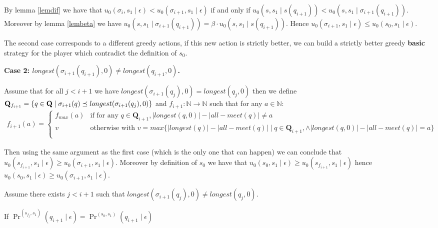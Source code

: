 \documentclass[11pt]{article}
\begin{document}
By lemma \ref{lemdif} we have that $u_0(\sigma_i,s_1 \mid \epsilon) < u_0(\sigma_{i+1},s_1 \mid \epsilon)$ if and only if $u_0(s,s_1 \mid s(q_{i+1})) < u_0(s,s_1 \mid \sigma_{i+1}(q_{i+1}))$.
Moreover by lemma \ref{lembeta} we have $u_0(s,s_1 \mid \sigma_{i+1}(q_{i+1})) = \beta \cdot u_0(s,s_1 \mid s(q_{i+1}))$.
Hence $u_0(\sigma_{i+1},s_1 \mid \epsilon) \leq u_0(s_0,s_1 \mid \epsilon)$.

\bigskip
The second case corresponds to a different greedy actions, if this new action is strictly better, we can build a strictly better greedy \textbf{basic} strategy for the player which contradict the definition of $s_0$.

\textbf{Case 2: $longest(\sigma_{i+1}(q_{i+1}),0) \neq longest(q_{i+1},0)$.}

Assume that for all $j < i+1$ we have $longest(\sigma_{i+1}(q_{j}),0) = longest(q_{j},0)$ then we define $\mathbf{Q}_{f_{i+1}} = \{q \in \mathbf{Q} \mid \sigma_{i+1}(q) \preceq longest(\sigma_{i+1}(q_{j}),0) \}$ and  $f_{i+1} : \mathbb{N} \rightarrow \mathbb{N}$ such that for any $a \in \mathbb{N}$:
\begin{eqnarray*}
f_{i+1}(a) =
\begin{cases}
f_{max}(a) & \text{if for any } q \in \mathbf{Q}_{i+1}, |longest(q,0)| - |all-meet(q)| \neq a\\
v & \text{otherwise with } v = max \{|longest(q)| - |all-meet(q)| \mid q \in \mathbf{Q}_{i+1}, \land |longest(q,0)| - |all-meet(q)| = a \}\\
\end{cases}
\end{eqnarray*}

Then using the same argument as the first case (which is the only one that can happen) we can conclude that  $u_0(s_{f_{i+1}},s_1 \mid \epsilon) \geq u_0(\sigma_{i+1},s_1 \mid \epsilon)$. Moreover by definition of $s_0$ we have that
$u_0(s_0,s_1 \mid \epsilon) \geq u_0(s_{f_{i+1}},s_1 \mid \epsilon)$ hence $u_0(s_0,s_1 \mid \epsilon) \geq u_0(\sigma_{i+1},s_1 \mid \epsilon)$.

\bigskip
Assume there exists $j < i+1$ such that $longest(\sigma_{i+1}(q_{j}),0) \neq longest(q_{j},0)$.

\begin{mylem}
If $\Pr^{(s_{f_j},s_1)}(q_{i+1} \mid \epsilon) = \Pr^{(s_{0},s_1)}(q_{i+1} \mid \epsilon)$
\end{mylem}
\end{document}
